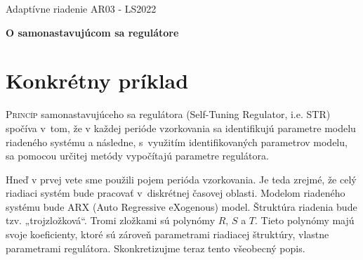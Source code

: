 \documentclass[a4paper, 10pt, ]{article}
\def\oznacenieCasti{AR03 - LS2022}
\begin{document}
\lstset{%
style=mystyle,
rangebeginprefix=\#\#\#\ cellB\ ,%
rangebeginsuffix=\ \#\#\#,%
rangeendprefix=\#\#\#\ cellE\ ,%
rangeendsuffix=\ \#\#\#,%
includerangemarker=false,
}






\fontsize{12pt}{22pt}\selectfont

\centerline{\textsf{Adaptívne riadenie} \hfill \textsf{\oznacenieCasti}}

\fontsize{18pt}{22pt}\selectfont





\begin{flushleft}
	\textbf{\textsf{O samonastavujúcom sa regulátore}}
\end{flushleft}





\normalsize

\bigskip

{\hypersetup{hidelinks}

\tableofcontents

}

\bigskip

\vspace{18pt}












\section{Konkrétny príklad}
\label{konkretPriklad}


\lettrine[lines=3, nindent=0pt]{P}{rincíp} samonastavujúceho sa regulátora (Self-Tuning Regulator, i.e. STR) spočíva v~tom, že v každej perióde vzorkovania sa identifikujú parametre modelu riadeného systému a následne, s~využitím identifikovaných parametrov modelu, sa pomocou určitej metódy vypočítajú parametre regulátora.

Hneď v prvej vete sme použili pojem perióda vzorkovania. Je teda zrejmé, že celý riadiaci systém bude pracovať v~diskrétnej časovej oblasti. Modelom riadeného systému bude ARX (Auto Regressive eXogenous) model. Štruktúra riadenia bude tzv.  „trojzložková“. Tromi zložkami sú polynómy $R$, $S$ a $T$. Tieto polynómy majú svoje koeficienty, ktoré sú zároveň parametrami riadiacej štruktúry, vlastne parametrami regulátora.
Skonkretizujme teraz tento všeobecný popis.
\end{document}
